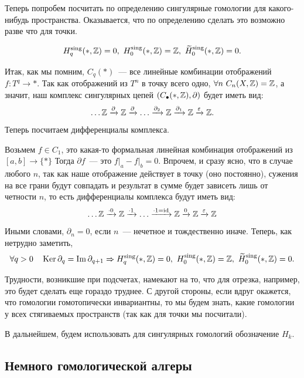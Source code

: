     Теперь попробем посчитать по определению сингулярные гомологии для какого-нибудь пространства. 
    Оказывается, что по определению сделать это возможно разве что для точки.

    \begin{theorem}
        \[ H_{q}^{\mathrm{sing}}(*, \Z) = 0, \ H_{0}^{\mathrm{sing}}(*, \Z) = \Z, \ \widetilde{H}_{0}^{\mathrm{sing}}(*, \Z) = 0. \]
    \end{theorem}
      Итак, как мы помним, $C_{q}(*)$~--- все линейные комбинации отображений $f\colon T^{q} \to *$.
    Так как отображений из $T^n$ в точку всего одно, $\forall n \ C_{n}(X, \mathbb{Z})  = \mathbb{Z}$, а значит, наш комплекс
    сингулярных цепей $(C_{\bullet}(*, \mathbb{Z}), \partial)$ будет иметь вид:
    \[ \ldots \mathbb{Z} \xrightarrow{\partial} \mathbb{Z} \xrightarrow{\partial} \ldots \xrightarrow{\partial_2} \mathbb{Z} \xrightarrow{\partial_{1}} \mathbb{Z} \xrightarrow{\varepsilon} \mathbb{Z}. \]
    Теперь посчитаем дифференциалы комплекса.

    Возьмем $f \in C_{1}$, это какая-то формальная линейная комбинация отображений из $[a, b] \to \{ * \}$ Тогда $\partial f$~--- это
    $f\vert_{a} - f\vert_{b} = 0$. Впрочем, и сразу ясно, что в случае любого $n$, так как наше отображение действует в точку (оно постоянно),
    сужения на все грани будут совпадать и результат в сумме будет зависеть лишь от четности $n$, то есть дифференциалы комплекса будут иметь вид:
    \[ \ldots \mathbb{Z} \xrightarrow{\cdot 0} \mathbb{Z} \xrightarrow{\cdot 1} \ldots \xrightarrow{\cdot 1 = \mathrm{id}} \mathbb{Z} \xrightarrow{0} \mathbb{Z} \xrightarrow{\varepsilon} \mathbb{Z} \]
    Иными словами, $\partial_n = 0$, если $n$~--- нечетное и тождественно иначе. Теперь, как нетрудно заметить,
    \[ \forall q > 0 \quad \Ker{\partial_{q}} = \Im{\partial_{q + 1}} \Rightarrow H_{q}^{\mathrm{sing}}(*, \Z) = 0, \ H_{0}^{\mathrm{sing}}(*, \Z) = \Z, \ \widetilde{H}_{0}^{\mathrm{sing}}(*, \Z) = 0. \]


    Трудности, возникшие при подсчетах, намекают на то, что для отрезка, например, это будет сделать еще гораздо труднее.
    С другой стороны, если вдруг окажется, что гомологии гомотопически инвариантны, то мы будем знать, какие гомологии у всех
    стягиваемых пространств (так как для точки мы посчитали).

    В дальнейшем, будем использовать для сингулярных гомологий обозначение $H_{k}$.

    \subsection{Немного гомологической алгеры}

